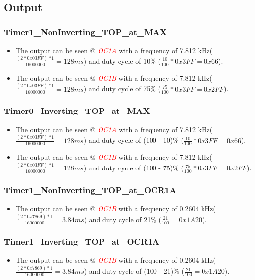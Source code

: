 \documentclass[oneside]{book}
\newcommand{\pinFormat}[1]{\emph{\textcolor{red}{#1}}}
\begin{document}
\subsection{Output}\subsubsection{Timer1\_NonInverting\_TOP\_at\_MAX}
\begin{itemize}
    \item The output can be seen @ \pinFormat{OC1A} with a frequency of 7.812 kHz($\frac{(2*0x03FF) * 1}{16000000} = 128 ms$) and duty cycle of 10\% ($\frac{10}{100} * 0x3FF = 0x66$).
    \item The output can be seen @ \pinFormat{OC1B} with a frequency of 7.812 kHz($\frac{(2*0x03FF) * 1}{16000000} = 128 ms$) and duty cycle of 75\% ($\frac{75}{100} * 0x3FF = 0x2FF$).
\end{itemize}
\subsubsection{Timer0\_Inverting\_TOP\_at\_MAX}
\begin{itemize}
    \item The output can be seen @ \pinFormat{OC1A} with a frequency of 7.812 kHz($\frac{(2*0x03FF) * 1}{16000000} = 128 ms$) and duty cycle of (100 - 10)\% ($\frac{10}{100} * 0x3FF = 0x66$).
    \item The output can be seen @ \pinFormat{OC1B} with a frequency of 7.812 kHz($\frac{(2*0x03FF) * 1}{16000000} = 128 ms$) and duty cycle of (100 - 75)\% ($\frac{75}{100} * 0x3FF = 0x2FF$).
\end{itemize}
\subsubsection{Timer1\_NonInverting\_TOP\_at\_OCR1A}
\begin{itemize}
    \item The output can be seen @ \pinFormat{OC1B} with a frequency of 0.2604 kHz($\frac{(2*0x7869) * 1}{16000000} = 3.84 ms$) and duty cycle of 21\% ($\frac{21}{100} = 0x1A20$).
\end{itemize}
\subsubsection{Timer1\_Inverting\_TOP\_at\_OCR1A}
\begin{itemize}
    \item The output can be seen @ \pinFormat{OC1B} with a frequency of 0.2604 kHz($\frac{(2*0x7869) * 1}{16000000} = 3.84 ms$) and duty cycle of (100 - 21)\% ($\frac{21}{100} = 0x1A20$).
\end{itemize}
\end{document}
